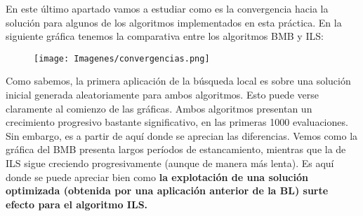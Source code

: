 \documentclass[10pt, a4paper]{article}
\theoremstyle{theorem-style}
\theoremstyle{theorem-style}
\theoremstyle{theorem2-style}
\theoremstyle{definition-style}
\theoremstyle{remark-style}
\theoremstyle{example-style}
\theoremstyle{definition-style}
\theoremstyle{remark-style}
\theoremstyle{remark-style}
\begin{document}
En este último apartado vamos a estudiar como es la convergencia hacia la solución para algunos de los algoritmos implementados en esta práctica. En la siguiente gráfica tenemos la comparativa entre los algoritmos BMB y ILS:   

\begin{figure}[htp]
\centering
\texttt{[image: Imagenes/convergencias.png]}
\label{}
\end{figure}

Como sabemos, la primera aplicación de la búsqueda local es sobre una solución inicial generada aleatoriamente para ambos algoritmos. Esto puede verse claramente al comienzo de las gráficas. Ambos algoritmos presentan un crecimiento progresivo bastante significativo, en las primeras 1000 evaluaciones. Sin embargo, es a partir de aquí donde se aprecian las diferencias. Vemos como la gráfica del BMB presenta largos períodos de estancamiento, mientras que la de ILS sigue creciendo progresivamente (aunque de manera más lenta). Es aquí donde se puede apreciar bien como \textbf{la explotación de una solución optimizada (obtenida por una aplicación anterior de la BL) surte efecto para el algoritmo ILS. }
\end{document}
